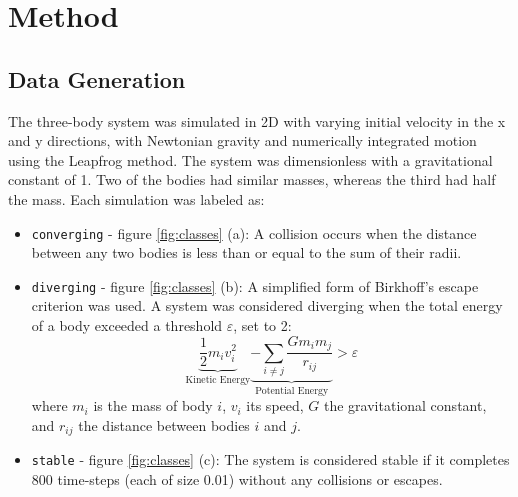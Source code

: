 \documentclass[%
 reprint,
 amsmath,amssymb,
 aps,
]{revtex4-2}
\begin{document}




\section{\label{sec:method}Method} %


\subsection{Data Generation}

The three-body system was simulated in 2D with varying initial velocity in the x and y directions, with Newtonian gravity and numerically integrated motion using the Leapfrog method. The system was dimensionless with a gravitational constant of 1. Two of the bodies had similar masses, whereas the third had half the mass.
Each simulation was labeled as: 

\begin{itemize}
    \item \texttt{converging} - figure \ref{fig:classes} (a): A collision occurs when the distance between any two bodies is less than or equal to the sum of their radii.
    
    \item \texttt{diverging} - figure \ref{fig:classes} (b): A simplified form of Birkhoff's escape criterion \cite{birkhoff1927dynamical} was used. A system was considered diverging when the total energy of a body exceeded a threshold $\varepsilon$, set to 2:
    \[
    \underbrace{\frac{1}{2}m_i v_i^2}_{\text{Kinetic Energy}} \underbrace{-\sum_{i \ne j} \frac{G m_i m_j}{r_{ij}}}_{\text{Potential Energy}} > \varepsilon
    \] 
    where $m_i$ is the mass of body $i$, $v_i$ its speed, $G$ the gravitational constant, and $r_{ij}$ the distance between bodies $i$ and $j$.

    \item \texttt{stable} - figure \ref{fig:classes} (c): The system is considered stable if it completes 800 time-steps (each of size 0.01) without any collisions or escapes.
\end{itemize}
\end{document}
